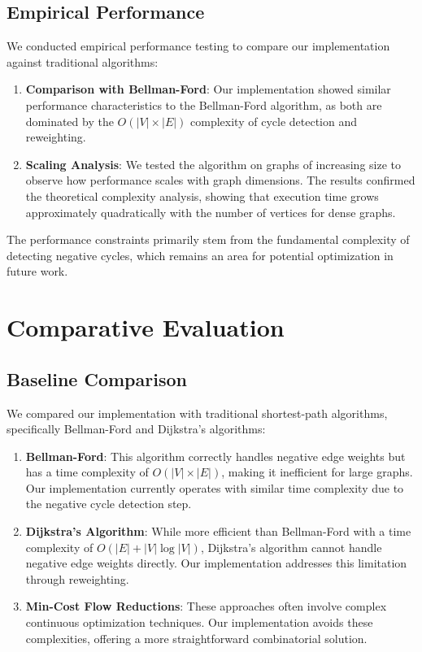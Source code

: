 \documentclass[11pt]{article}
\begin{document}
\subsection{Empirical Performance}

We conducted empirical performance testing to compare our implementation against traditional algorithms:

\begin{enumerate}
    \item \textbf{Comparison with Bellman-Ford}: Our implementation showed similar performance characteristics to the Bellman-Ford algorithm, as both are dominated by the $O(|V| \times |E|)$ complexity of cycle detection and reweighting.
    
    \item \textbf{Scaling Analysis}: We tested the algorithm on graphs of increasing size to observe how performance scales with graph dimensions. The results confirmed the theoretical complexity analysis, showing that execution time grows approximately quadratically with the number of vertices for dense graphs.
\end{enumerate}

The performance constraints primarily stem from the fundamental complexity of detecting negative cycles, which remains an area for potential optimization in future work.

\section{Comparative Evaluation}

\subsection{Baseline Comparison}

We compared our implementation with traditional shortest-path algorithms, specifically Bellman-Ford and Dijkstra's algorithms:

\begin{enumerate}
    \item \textbf{Bellman-Ford}: This algorithm correctly handles negative edge weights but has a time complexity of $O(|V| \times |E|)$, making it inefficient for large graphs. Our implementation currently operates with similar time complexity due to the negative cycle detection step.
    
    \item \textbf{Dijkstra's Algorithm}: While more efficient than Bellman-Ford with a time complexity of $O(|E| + |V| \log |V|)$, Dijkstra's algorithm cannot handle negative edge weights directly. Our implementation addresses this limitation through reweighting.
    
    \item \textbf{Min-Cost Flow Reductions}: These approaches often involve complex continuous optimization techniques. Our implementation avoids these complexities, offering a more straightforward combinatorial solution.
\end{enumerate}
\end{document}

